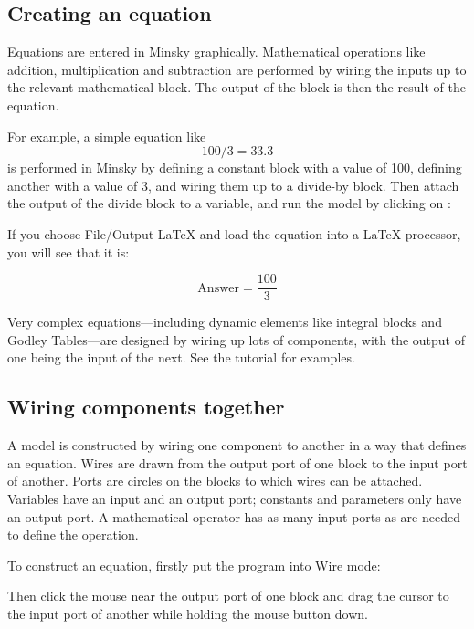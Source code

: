 \subsection{Creating an equation}

Equations are entered in Minsky graphically. Mathematical operations
like addition, multiplication and subtraction are performed by wiring
the inputs up to the relevant mathematical block. The output of the
block is then the result of the equation. 

For example, a simple equation like
\begin{displaymath}
100/3 = 33.3
\end{displaymath}
is performed in Minsky by defining a constant block with a value of 100, defining another with a value of 3, and wiring them up to a divide-by block. Then attach the output of the divide block to a variable, and run the model by clicking on :


If you choose File/Output LaTeX and load the equation into a LaTeX processor, you will see that it is:

\begin{displaymath}
\mathrm{Answer}=\frac{100}{3}
\end{displaymath}

Very complex equations---including dynamic elements like integral
blocks and Godley Tables---are designed by wiring up lots of
components, with the output of one being the input of the next. See
the tutorial for examples.

\subsection{Wiring components together}

A model is constructed by wiring one component to another in a way
that defines an equation. Wires are drawn from the output port of one
block to the input port of another. Ports are circles on the blocks to
which wires can be attached. Variables have an input and an output
port; constants and parameters only have an output port. A
mathematical operator has as many input ports as are needed to define
the operation.


To construct an equation, firstly put the program into Wire mode:



Then click the mouse near the output port of one block and drag the
cursor to the input port of another while holding the mouse button
down. 


